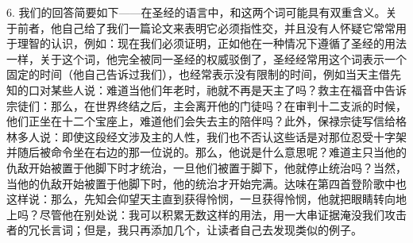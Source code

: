 6. 我们的回答简要如下——在圣经的语言中，和这两个词可能具有双重含义。关于前者，他自己给了我们一篇论文来表明它必须指性交，并且没有人怀疑它常常用于理智的认识，例如：\newline{}\newline{}现在我们必须证明，正如他在一种情况下遵循了圣经的用法一样，关于这个词，他完全被同一圣经的权威驳倒了，圣经经常用这个词表示一个固定的时间（他自己告诉过我们），也经常表示没有限制的时间，例如当天主借先知的口对某些人说：\newline{}\newline{}\newline{}难道当他们年老时，祂就不再是天主了吗？救主在福音中告诉宗徒们：\newline{}\newline{}\newline{}那么，在世界终结之后，主会离开他的门徒吗？在审判十二支派的时候，他们正坐在十二个宝座上，难道他们会失去主的陪伴吗？此外，保禄宗徒写信给格林多人说：\newline{}\newline{}即使这段经文涉及主的人性，我们也不否认这些话是对那位忍受十字架并随后被命令坐在右边的那一位说的。那么，他说是什么意思呢？难道主只当他的仇敌开始被置于他脚下时才统治，一旦他们被置于脚下，他就停止统治吗？当然，当他的仇敌开始被置于他脚下时，他的统治才开始完满。达味在第四首登阶歌中也这样说：\newline{}\newline{}那么，先知会仰望天主直到获得怜悯，一旦获得怜悯，他就把眼睛转向地上吗？尽管他在别处说：\newline{}\newline{}我可以积累无数这样的用法，用一大串证据淹没我们攻击者的冗长言词；但是，我只再添加几个，让读者自己去发现类似的例子。\par

